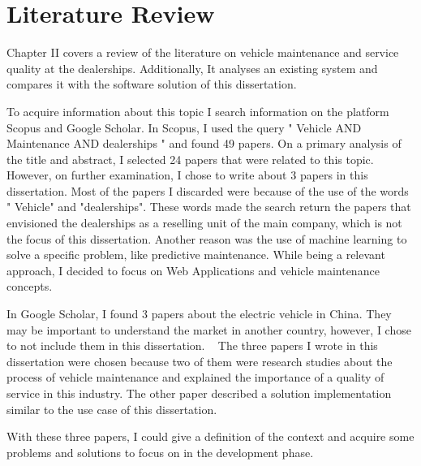 \chapter{Literature Review}%
\label{chapter:literatureReview}

\begin{introduction}
  Chapter II covers a review of the literature on vehicle maintenance and service quality at the dealerships. 
  Additionally, It analyses an existing system and compares it with the software solution of this dissertation.
\end{introduction} 


To acquire information about this topic I search information on the platform Scopus and Google Scholar. 
In Scopus, I used the query " Vehicle AND Maintenance AND dealerships " and found 49 papers.
On a primary analysis of the title and abstract, I selected 24 papers that were related to this topic.
However, on further examination, I chose to write about 3 papers in this dissertation. 
Most of the papers I discarded were because of the use of the words " Vehicle" and "dealerships". 
These words made the search return the papers that envisioned the dealerships as a reselling unit of the main company, which is not the focus of this dissertation.
Another reason was the use of machine learning to solve a specific problem, like predictive maintenance. 
While being a relevant approach, I decided to focus on Web Applications and vehicle maintenance concepts.

In Google Scholar, I found 3 papers about the electric vehicle in China. 
They may be important to understand the market in another country, however, I chose to not include them in this dissertation.  
The three papers I wrote in this dissertation were chosen because two of them were research studies about the process of vehicle maintenance and explained the importance of a quality of service in this industry.
The other paper described a solution implementation similar to the use case of this dissertation.

With these three papers, I could give a definition of the context and acquire some problems and solutions to focus on in the development phase.  




